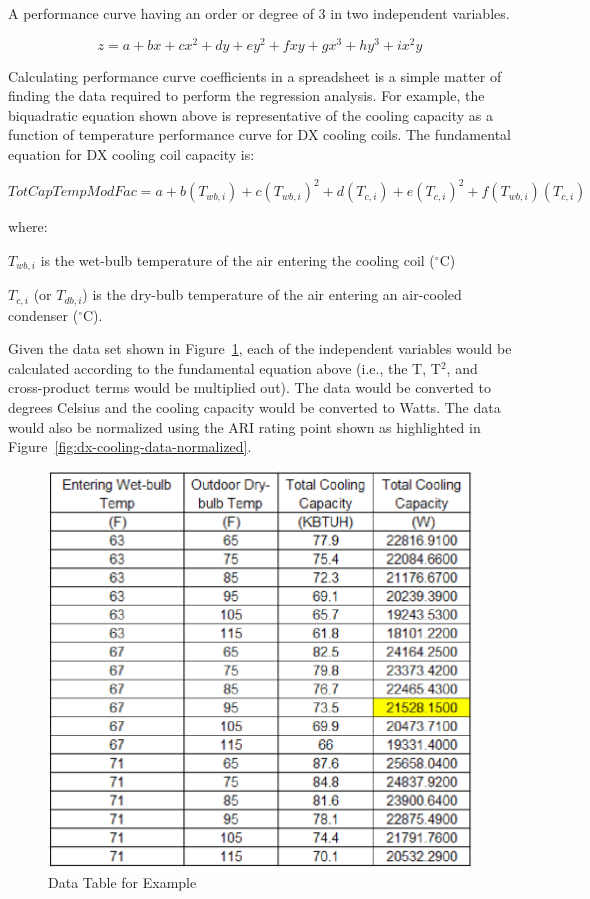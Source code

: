 A performance curve having an order or degree of 3 in two independent variables.

\begin{equation}
z = a + bx + c{x^2} + dy + e{y^2} + fxy + g{x^3} + h{y^3} + i{x^2}y
\end{equation}

Calculating performance curve coefficients in a spreadsheet is a simple matter of finding the data required to perform the regression analysis. For example, the biquadratic equation shown above is representative of the cooling capacity as a function of temperature performance curve for DX cooling coils. The fundamental equation for DX cooling coil capacity is:

\begin{equation}
TotCapTempModFac = a + b\left( {{T_{wb,i}}} \right) + c{\left( {{T_{wb,i}}} \right)^2} + d\left( {{T_{c,i}}} \right) + e{\left( {{T_{c,i}}} \right)^2} + f\left( {{T_{wb,i}}} \right)\left( {{T_{c,i}}} \right)
\end{equation}

where:

\(T_{wb,i}\) is the wet-bulb temperature of the air entering the cooling coil (\(^{\circ}\)C)

\(T_{c,i}\) (or \(T_{db,i}\)) is the dry-bulb temperature of the air entering an air-cooled condenser (\(^{\circ}\)C).

Given the data set shown in Figure~\ref{fig:dx-cooling-data-table}, each of the independent variables would be calculated according to the fundamental equation above (i.e., the T, T\(^{2}\), and cross-product terms would be multiplied out). The data would be converted to degrees Celsius and the cooling capacity would be converted to Watts. The data would also be normalized using the ARI rating point shown as highlighted in Figure~\ref{fig:dx-cooling-data-normalized}.

\begin{figure}[htbp]
\centering
\includegraphics{media/image7865.png}
\caption{Data Table for Example \protect \label{fig:dx-cooling-data-table}}
\end{figure}

